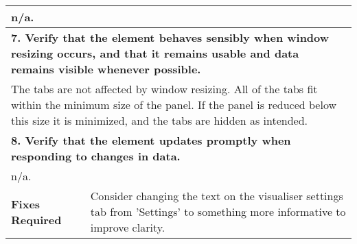 \begin{longtable}{ l p{10cm} }
 \multicolumn{2}{p{14cm}}{n/a.}\\
 \hline
 \multicolumn{2}{p{14cm}}{\textbf{7. Verify that the element behaves sensibly when window resizing occurs, and that it remains usable and data remains visible whenever possible.}}\\
 \multicolumn{2}{p{14cm}}{The tabs are not affected by window resizing. All of the tabs fit within the minimum size of the panel. If the panel is reduced below this size it is minimized, and the tabs are hidden as intended.}\\
 \hline
 \multicolumn{2}{p{14cm}}{\textbf{8. Verify that the element updates promptly when responding to changes in data.}}\\
 \multicolumn{2}{p{14cm}}{n/a.}\\
 \hline
 \textbf{Fixes Required} & Consider changing the text on the visualiser settings tab from 'Settings' to something more informative to improve clarity.\\
 \bottomrule
\end{longtable}
\clearpage

